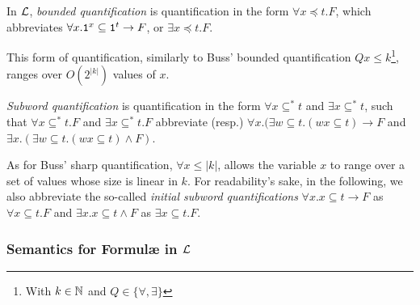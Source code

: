 \begin{notation}
In $\mathcal{L}$, \emph{bounded
quantification} is quantification
in the form $\forall x\preceq t.F$,
which abbreviates
$\forall x.
\mathtt{1}^x\subseteq \mathtt{1}^t\rightarrow F$,
or
$\exists x\preceq t.F$.
%
\end{notation}
This form of quantification, similarly to Buss' bounded quantification $Q x \le k$\footnote{With $k \in \mathbb{N}$ and $Q\in\{\forall, \exists\}$}, ranges over $O(2^{|k|})$ values of $x$.

\begin{notation}
\emph{Subword quantification}
is quantification in the form
$\forall x\subseteq^* t$ and
$\exists x\subseteq^* t$,
such that $\forall x\subseteq^* t.F$
and $\exists x\subseteq^* t.F$
abbreviate (resp.)
$\forall x.(\exists w \subseteq t.(wx\subseteq t)
\rightarrow F$
and $\exists x.(\exists w\subseteq t.(wx
\subseteq t) \wedge F)$.
%
\end{notation}
\noindent
As for Buss' sharp quantification, $\forall x \le |k|$, allows the variable $x$ to range over a set of values whose size is linear in $k$.
%
For readability's sake, in the following,
we also abbreviate the so-called
\emph{initial subword quantifications}
$\forall x.x\subseteq t \rightarrow F$
as $\forall x\subseteq t.F$
and $\exists x.x\subseteq t \wedge F$
as $\exists x\subseteq t.F$.






\subsubsection{Semantics for Formul\ae{} in $\mathcal{L}$}\label{subsub:semantics}

